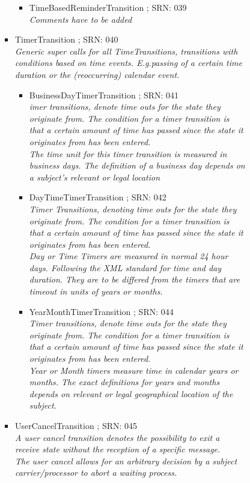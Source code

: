 \begin{itemize}
\begin{itemize}
\begin{itemize}
\begin{itemize}
\begin{itemize}
\begin{itemize}
					\item TimeBasedReminderTransition ; SRN: 039 \\ \textit{Comments have to be added}
				\end{itemize}
				\item TimerTransition ; SRN: 040 \\ \textit{Generic super calls for all TimeTransitions, transitions with conditions based on time events. E.g.passing of a certain time duration or the (reoccurring) calendar event. }
				\begin{itemize}
					\item BusinessDayTimerTransition ; SRN: 041 \\ \textit{imer transitions, denote time outs for the state they originate from. The condition for a timer transition is that a certain amount of time has passed since the state it originates from has been entered.\\ The time unit for this timer transition is measured in business days. The definition of a business day depends on a subject's relevant or legal location}
					\item DayTimeTimerTransition ; SRN: 042 \\ \textit{Timer Transitions, denoting time outs for the state they originate from. The condition for a timer transition is that a certain amount of time has passed since the state it originates from has been entered.\\ Day or Time Timers are measured in normal 24 hour days. Following the XML standard for time and day duration. They are to be differed from the timers that are timeout in units of years or months.}
					\item YearMonthTimerTransition ; SRN: 044 \\ \textit{Timer transitions, denote time outs for the state they originate from. The condition for a timer transition is that a certain amount of time has passed since the state it originates from has been entered.\\ Year or Month timers measure time in calendar years or months. The exact definitions for years and months depends on relevant or legal geographical location of the subject.}
				\end{itemize}
				\item UserCancelTransition ; SRN: 045 \\ \textit{A user cancel transition denotes the possibility to exit a receive state without the reception of a specific message.\\ The user cancel allows for an arbitrary decision by a subject carrier/processor to abort a waiting process.}

\end{itemize}
\end{itemize}
\end{itemize}
\end{itemize}
\end{itemize}
